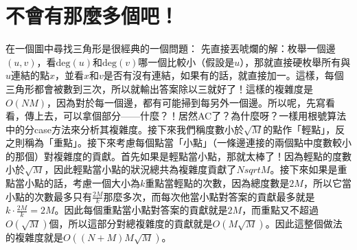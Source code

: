 \documentclass[main.tex]{subfiles}
\begin{document}
\section{不會有那麼多個吧！}
	在一個圖中尋找三角形是很經典的一個問題：
	先直接丟唬爛的解：枚舉一個邊$(u, v)$，看$\text{deg}(u)$和$\text{deg}(v)$哪一個比較小（假設是$u$），那就直接硬枚舉所有與$u$連結的點$x$，並看$x$和$v$是否有沒有連結，如果有的話，就直接加一。這樣，每個三角形都會被數到三次，所以就輸出答案除以三就好了！這樣的複雜度是$O(NM)$，因為對於每一個邊，都有可能掃到每另外一個邊。所以呢，先寫看看，傳上去，可以拿個部分——什麼？！居然AC了？為什麼呀？一樣用根號算法中的分case方法來分析其複雜度。接下來我們稱度數小於$\sqrt{M}$的點作「輕點」，反之則稱為「重點」。接下來考慮每個點當「小點」（一條邊連接的兩個點中度數較小的那個）對複雜度的貢獻。首先如果是輕點當小點，那就太棒了！因為輕點的度數小於$\sqrt{M}$，因此輕點當小點的狀況總共為複雜度貢獻了$N sqrt{M}$。接下來如果是重點當小點的話，考慮一個大小為$k$重點當輕點的次數，因為總度數是$2M$，所以它當小點的次數最多只有$\frac{2M}{k}$那麼多次，而每次他當小點對答案的貢獻最多就是$k \cdot \frac{2M}{k} = 2M$。因此每個重點當小點對答案的貢獻就是$2M$，而重點又不超過$O(\sqrt{M})$個，所以這部分對總複雜度的貢獻就是$O(M\sqrt{M})$。因此這整個做法的複雜度就是$O((N+M)M\sqrt{M})$。

	
\end{document}
